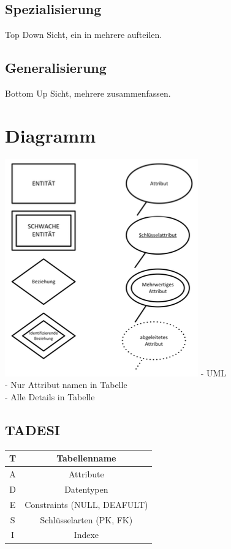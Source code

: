 \documentclass[a4paper,8pt]{article} %
\begin{document}
\begin{small}
\begin{minipage}{0.32 \linewidth}
			\subsection{Spezialisierung}
				Top Down Sicht, ein in mehrere aufteilen.
			\subsection{Generalisierung}
				Bottom Up Sicht, mehrere zusammenfassen.
		\section{Diagramm}
			\includegraphics[width=\linewidth]{diagramm}
			\linebreak
			- UML\\
			- Nur Attribut namen in Tabelle\\
			- Alle Details in Tabelle
			
			\subsection{TADESI}
			\begin{tabular}{c|c}
				T	& Tabellenname\\\hline
				A	& Attribute\\\hline
				D	& Datentypen\\\hline
				E	& Constraints (NULL, DEAFULT)\\\hline
				S	& Schlüsselarten (PK, FK)\\\hline
				I	& Indexe\\
			\end{tabular}
	\end{minipage}

	\end{small}
\end{document}
